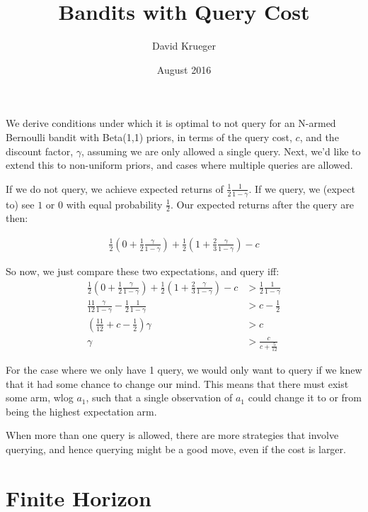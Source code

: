 \documentclass{article}
\title{Bandits with Query Cost}
\author{David Krueger}
\date{August 2016}
\begin{document}
\maketitle


We derive conditions under which it is optimal to not query for an N-armed Bernoulli bandit with Beta(1,1) priors, in terms of the query cost, $c$, and the discount factor, $\gamma$, assuming we are only allowed a single query.
Next, we'd like to extend this to non-uniform priors, and cases where multiple queries are allowed.

If we do not query, we achieve expected returns of $\frac{1}{2}\frac{1}{1-\gamma}$.
If we query, we (expect to) see $1$ or $0$ with equal probability $\frac{1}{2}$.
Our expected returns after the query are then:

\begin{align}
\frac{1}{2} (0 + \frac{1}{2}\frac{\gamma}{1-\gamma}) + \frac{1}{2}(1 + \frac{2}{3}\frac{\gamma}{1-\gamma}) - c
\end{align}

So now, we just compare these two expectations, and query iff:
\begin{align}
\frac{1}{2}(0 + \frac{1}{2}\frac{\gamma}{1-\gamma}) + \frac{1}{2}(1 + \frac{2}{3}\frac{\gamma}{1-\gamma}) - c &> \frac{1}{2}\frac{1}{1-\gamma} \\
\frac{11}{12}\frac{\gamma}{1-\gamma} - \frac{1}{2}\frac{1}{1-\gamma} &> c - \frac{1}{2} \\
(\frac{11}{12} + c - \frac{1}{2}) \gamma &> c \\
\gamma &> \frac{c}{c + \frac{5}{12}}
\end{align}


For the case where we only have 1 query, we would only want to query if we knew that it had some chance to change our mind.
This means that there must exist some arm, wlog $a_1$, such that a single observation of $a_1$ could change it to or from being the highest expectation arm.


When more than one query is allowed, there are more strategies that involve querying, and hence querying might be a good move, even if the cost is larger.


\section{Finite Horizon}
\end{document}
